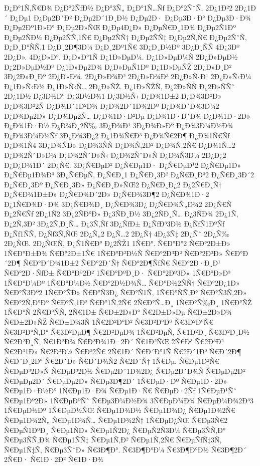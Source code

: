 {Ð¿Ð°1Ñ‚Ñ€Ð¾
Ð¿Ð°2ÑƒÐ½
Ð¿Ð°3Ñ„
Ð¿Ð°1Ñ…Ñƒ
Ð¿Ð°2ÑˆÑ‚
2Ð¿1Ð²2
2Ð¿1Ð´
Ð¿Ðµ1
Ð¿Ðµ2Ð´Ð²
Ð¿Ðµ2Ð´1Ð¸Ð½
Ð¿Ðµ2Ð·
Ð¿Ðµ3Ð·Ð°
Ð¿Ðµ3Ð·Ð¾
Ð¿Ðµ2Ðº1Ð»Ð°
Ð¿Ðµ2Ð»ÑŒ
Ð¿Ðµ4Ð¿Ð»
Ð¿ÐµÑ€Ð¸1Ð¾
Ð¿Ðµ2Ñ1Ðº
Ð¿Ðµ2ÑÐ½
Ð¿Ðµ2ÑÑ‚1Ñ€
Ð¿Ðµ2ÑÑ†
Ð¿Ðµ2ÑÑ‡
Ð¿Ðµ2Ñ‚Ñ€
Ð¿Ðµ2ÑˆÑ‚
Ð¿Ð¸Ð°ÑÑ‚1
Ð¿Ð¸2Ð¶3Ð¼
Ð¿Ð¸2Ðº1Ñ€
3Ð¿Ð¸Ð½Ðº
3Ð¿Ð¸ÑÑ
4Ð¿3Ðº
2Ð¿Ð».
4Ð¿Ð»Ð°.
Ð¿Ð»Ð°1Ñ
Ð¿1Ð»ÐµÐ¼.
Ð¿1Ð»ÐµÐ¼Ñ
2Ð¿Ð»ÐµÐ½
Ð¿2Ð»ÐµÐ½Ðº
Ð¿1Ð»Ðµ2Ð¾
Ð¿Ð»ÐµÑ1Ðº
Ð¿1Ð»ÐµÑŽ
2Ð¿Ð»Ð¸Ð²
3Ð¿2Ð»Ð¸Ðº
2Ð¿Ð»Ð¾.
2Ð¿Ð»Ð¾Ð²
2Ð¿Ð»Ð¾Ð³
2Ð¿Ð»Ñ‹Ð¹
2Ð¿Ð»Ñ‹Ð¼
Ð¿1Ð»Ñ‹Ð½
Ð¿1Ð»Ñ‹Ñ…
2Ð¿Ð»ÑŽ.
Ð¿1Ð»ÑŽÑ‚
Ð¿2Ð»ÑÑ
Ð¿2Ð»ÑÑˆ
2Ð¿1Ð½
Ð¿3Ð½Ð°
Ð¿3Ð½Ð¾1
Ð¿3Ð½Ñ‹
Ð¿Ð¾1Ð±2
Ð¿Ð¾3Ð²Ð»
Ð¿Ð¾3Ð²2Ñ
Ð¿Ð¾Ð´1Ð²Ð¾
Ð¿Ð¾2Ð´1Ð¾2Ðº
Ð¿Ð¾Ð´Ð¾3Ð¼2
Ð¿Ð¾Ðµ2Ð»
Ð¿Ð¾Ðµ2Ñ…
Ð¿Ð¾1Ð·Ð²Ðµ
Ð¿Ð¾1Ð·Ð´Ð¾
Ð¿Ð¾1Ð·2Ð»
Ð¿Ð¾1Ð·Ð½
Ð¿Ð¾Ð¸2Ñ‰
3Ð¿Ð¾Ð¹
3Ð¿Ð¾Ð»Ðº
Ð¿Ð¾3Ð¼Ð½Ð¾
Ð¿Ð¾3Ð¼Ð½Ñƒ
3Ð¿Ð¾3Ð¿2
Ð¿1Ð¾Ñ€Ð³
Ð¿Ð¾Ñ€2Ð¶
Ð¿Ð¾1Ñ€Ñƒ
Ð¿Ð¾1Ñ4
3Ð¿Ð¾ÑÐ»
Ð¿Ð¾3ÑÑ
Ð¿Ð¾Ñ‚2Ð²
Ð¿Ð¾Ñ‚2Ñ€
Ð¿Ð¾1Ñ…2
Ð¿Ð¾2ÑˆÐ»Ð¾
Ð¿Ð¾2ÑˆÐ»Ñ‹
Ð¿Ð¾2ÑˆÐ»Ñ
Ð¿Ð¾Ñ3Ð¼
2Ð¿Ð¿2
Ð¿Ð¿Ð¾1Ð´
2Ð¿Ñ€.
3Ð¿Ñ€ÐµÐ²
Ð¿Ñ€Ðµ1Ð·
Ð¿Ñ€ÐµÐ¹2
Ð¿Ñ€Ðµ1Ð»
Ð¿Ñ€Ðµ1Ð¾Ð³
3Ð¿Ñ€ÐµÑ‚
Ð¿Ñ€Ð¸1
Ð¿Ñ€Ð¸3Ð²
Ð¿Ñ€Ð¸Ð³2
Ð¿Ñ€Ð¸3Ð´2
Ð¿Ñ€Ð¸3Ðº
Ð¿Ñ€Ð¸3Ð»
Ð¿Ñ€Ð¸Ð»ÑŒ2
Ð¿Ñ€Ð¸Ð¿2
Ð¿2Ñ€Ð¸Ñ†
Ð¿Ñ€Ð¾1Ð±Ð»
Ð¿Ñ€Ð¾Ð´2Ð»
Ð¿Ñ€Ð¾3Ð¶2
Ð¿Ñ€Ð¾1Ð·2
Ð¿1Ñ€Ð¾Ð·Ð¾
3Ð¿Ñ€Ð¾Ð¸
Ð¿Ñ€Ð¾3Ð¿
Ð¿Ñ€Ð¾Ñ„Ð¾2
2Ð¿Ñ€Ñ
Ð¿2Ñ€Ñƒ
2Ð¿1Ñ2
3Ð¿2ÑÐ°Ð»
Ð¿3ÑÐ¸Ð½
3Ð¿2ÑÐ¸Ñ…
Ð¿3ÑÐ¾
2Ð¿1Ñ‚
Ð¿2Ñ‚3Ð²
3Ð¿2Ñ‚Ð¸Ñ…
Ð¿3Ñ‚Ñƒ
3Ð¿ÑƒÐ±
Ð¿ÑƒÐ³3Ð½
Ð¿ÑƒÑ1ÐºÑƒ
Ð¿Ñƒ1ÑÑ‚
Ð¿Ñƒ3Ñ‚ÑŒ
2Ð¿Ñ„2
Ð¿Ñ…2
2Ð¿Ñ†
4Ð¿3Ñ‡
2Ð¿Ñˆ
2Ð¿Ñ‰
2Ð¿ÑŒ.
2Ð¿ÑŒÑ‚
Ð¿Ñ1Ñ€Ð°
Ð¿2ÑŽ1
1Ñ€Ð°.
Ñ€Ð°Ð°2
Ñ€Ð°2Ð±Ð»
1Ñ€Ð°Ð±Ð¾
Ñ€Ð°2Ð±1Ñ€
1Ñ€Ð°Ð²Ð½Ñ
Ñ€Ð°2Ð³Ð²
Ñ€Ð°2Ð³Ð»
Ñ€Ð°Ð´2Ð¶
Ñ€Ð°Ð´Ð¾1Ð±2
Ñ€Ð°2Ð´Ñ†
Ñ€Ð°2Ð¶ÑƒÑ€
Ñ€Ð°2Ð·Ð¸Ð¹
Ñ€Ð°2Ð·ÑƒÐ±
Ñ€Ð°Ðº2Ð²
1Ñ€Ð°ÐºÐ¸Ð·
Ñ€Ð°2Ðº3Ð»
1Ñ€Ð°Ð»Ð³
1Ñ€Ð°Ð¼Ðº
1Ñ€Ð°Ð¼Ð½
Ñ€Ð°2Ð½Ð¾Ñ…
Ñ€Ð°Ð½2ÑÑ†
Ñ€Ð°2Ð¿1Ð»
Ñ€Ð°Ñ3Ðº2
1Ñ€Ð°ÑÐ»
Ñ€Ð°Ñ3Ð¿
Ñ€Ð°Ñ1Ñ‚
1Ñ€Ð°ÑÑ‚Ð°
Ñ€Ð°Ñ3Ñ‚2Ð»
Ñ€Ð°2Ñ‚Ð°Ðº
Ñ€Ð°Ñ‚1Ð²
Ñ€Ð°1Ñ‚2Ñ€
2Ñ€Ð°Ñ…Ð¸
1Ñ€Ð°Ñ‰Ð¸
1Ñ€Ð°ÑŽ
1Ñ€Ð°Ñ
2Ñ€Ð°ÑÑ‚
2Ñ€1Ð±
Ñ€Ð±2Ð»Ð°
Ñ€2Ð±Ð»Ðµ
Ñ€Ð±2Ð»Ð¾
Ñ€Ð±2Ð»ÑŽ
Ñ€Ð±Ð¾3Ñ
1Ñ€2Ð²Ð°Ð²
Ñ€3Ð²Ð°Ðº
Ñ€3Ð²Ð°Ñ€
Ñ€3Ð²Ð°Ñ‚Ð°
Ñ€3Ð²ÐµÐ¶
Ñ€2Ð²ÐµÐ¾
1Ñ€Ð²ÐµÑ‚
Ñ€1Ð²Ð¸
Ñ€3Ð²Ð¸Ð½
Ñ€2Ð²Ð¸Ñ‚
Ñ€1Ð²Ð¾
Ñ€Ð²Ð¾1Ð·2Ð´
Ñ€1Ð²ÑŒ
2Ñ€Ð³
Ñ€2Ð³Ð²
Ñ€2Ð³1Ð»
Ñ€2Ð³Ð½
Ñ€Ð³2Ñ€
2Ñ€1Ð´
Ñ€Ð´Ð°1Ñ
Ñ€2Ð´1Ð²
Ñ€Ð´2Ð¶
Ñ€Ð´Ð¸2Ð°
Ñ€2Ð´Ð»
Ñ€Ð´Ð¾Ñ2
Ñ€2Ð´Ñ†
1Ñ€Ðµ.
Ñ€Ðµ1Ð²Ñ€
Ñ€ÐµÐ³2Ð»Ñ
Ñ€ÐµÐ³2Ð½
Ñ€Ðµ2Ð´1Ð¾2Ð¿
Ñ€Ðµ2Ð´Ð¾Ñ
Ñ€ÐµÐµ2Ð²
Ñ€ÐµÐµ2Ð´
Ñ€ÐµÐµ2Ð»
Ñ€Ðµ3Ð¶2Ð´
1Ñ€ÐµÐ·Ðº
Ñ€Ðµ1Ð·2Ð»
Ñ€Ðµ1Ð·Ð½Ð°
1Ñ€Ðµ1Ð·Ð¾
Ñ€Ðµ1Ð·Ñ€
Ñ€ÐµÐ·2Ñƒ
1Ñ€ÐµÐ¹Ñˆ
Ñ€Ðµ1Ðº2Ð»
1Ñ€ÐµÐºÑˆ
Ñ€Ðµ3Ð¼Ð½Ð¾
3Ñ€ÐµÐ¼Ð¾
Ñ€ÐµÐ¼Ð¾2Ð³3
1Ñ€ÐµÐ½Ðº
1Ñ€ÐµÐ½ÑŒ
Ñ€Ðµ1Ð¾Ð½
Ñ€Ðµ1Ð¾Ð¿
Ñ€Ðµ1Ð¾2Ñ€
Ñ€Ðµ1Ð¾2Ñ„
Ñ€Ðµ1Ð¾Ñ…
Ñ€Ðµ1Ð¾2Ñ†
1Ñ€ÐµÐ¿ÑŒ
Ñ€Ðµ3Ñ€2
Ñ€ÐµÑ1ÐºÐ¸
Ñ€Ðµ1ÑÐ»
Ñ€Ðµ1Ñ2Ð¿
Ñ€ÐµÑ2Ñ3Ð¼
Ñ€Ðµ3ÑÑ‚Ð°
Ñ€Ðµ3ÑÑ‚Ð¾
Ñ€Ðµ1ÑÑ‡
Ñ€Ðµ1Ñ‚Ð²
Ñ€Ðµ1Ñ‚2Ñ€
Ñ€ÐµÑƒÑ‡3Ñ‚
Ñ€Ðµ1Ñ‡Ñ‚
Ñ€Ðµ3ÑˆÐ»
Ñ€3Ð¶Ð°.
Ñ€3Ð¶Ð°Ð¼
Ñ€3Ð¶Ð°Ð½
Ñ€3Ð¶2Ð´
2Ñ€Ð·
Ñ€1Ð·2Ð²
Ñ€1Ð·Ð¾
}
